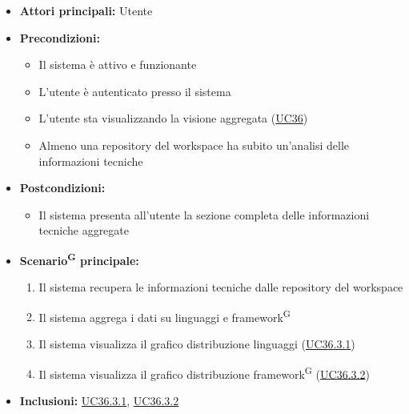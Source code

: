 \documentclass[a4paper, 11pt]{article}
\begin{document}
\begin{itemize}
    \item \textbf{Attori principali:} Utente
    \item \textbf{Precondizioni:}
    \begin{itemize}
        \item Il sistema è attivo e funzionante
        \item L'utente è autenticato presso il sistema
        \item L'utente sta visualizzando la visione aggregata (\hyperref[UC36]{UC36})
        \item Almeno una repository del workspace ha subito un'analisi delle informazioni tecniche
    \end{itemize}
    \item \textbf{Postcondizioni:}
    \begin{itemize}
        \item Il sistema presenta all'utente la sezione completa delle informazioni tecniche aggregate
    \end{itemize}
    \item \textbf{Scenario\textsuperscript{G} principale:}
    \begin{enumerate}
        \item Il sistema recupera le informazioni tecniche dalle repository del workspace
        \item Il sistema aggrega i dati su linguaggi e framework\textsuperscript{G}
        \item Il sistema visualizza il grafico distribuzione linguaggi (\hyperref[UC36.3.1]{UC36.3.1})
        \item Il sistema visualizza il grafico distribuzione framework\textsuperscript{G} (\hyperref[UC36.3.2]{UC36.3.2})
    \end{enumerate}
    \item \textbf{Inclusioni:} \hyperref[UC36.3.1]{UC36.3.1}, \hyperref[UC36.3.2]{UC36.3.2}
\end{itemize}
\end{document}
